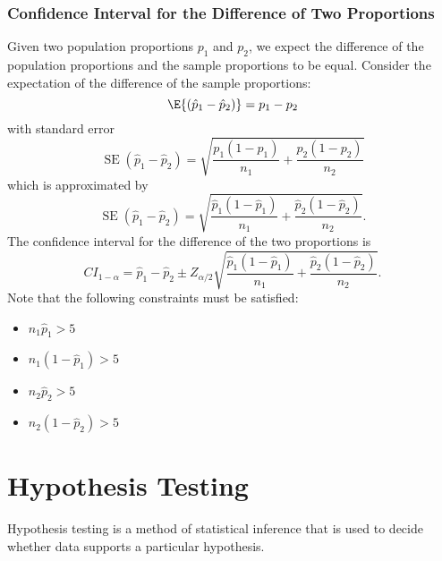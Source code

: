 \documentclass{article}
\begin{document}
\subsubsection{Confidence Interval for the Difference of Two Proportions}
Given two population proportions \(p_1\) and \(p_2\), we expect the
difference of the population proportions and the sample proportions to
be equal. Consider the expectation of the difference of the sample
proportions:
\begin{equation*}
    \E{\left( \hat{p}_1 - \hat{p}_2 \right)} = p_1 - p_2
\end{equation*}
with standard error
\begin{equation*}
    \operatorname{SE}\left( \hat{p}_1 - \hat{p}_2 \right) = \sqrt{\frac{p_1\left( 1 - p_1 \right)}{n_1} + \frac{p_2\left( 1 - p_2 \right)}{n_2}}
\end{equation*}
which is approximated by
\begin{equation*}
    \operatorname{SE}\left( \hat{p}_1 - \hat{p}_2 \right) = \sqrt{\frac{\hat{p}_1\left( 1 - \hat{p}_1 \right)}{n_1} + \frac{\hat{p}_2\left( 1 - \hat{p}_2 \right)}{n_2}}.
\end{equation*}
The confidence interval for the difference of the two proportions is
\begin{equation*}
    CI_{1-\alpha} = \hat{p}_1 - \hat{p}_2 \pm Z_{\alpha/2} \sqrt{\frac{\hat{p}_1\left( 1 - \hat{p}_1 \right)}{n_1} + \frac{\hat{p}_2\left( 1 - \hat{p}_2 \right)}{n_2}}.
\end{equation*}
Note that the following constraints must be satisfied:
\begin{itemize}
    \item \(n_1 \hat{p}_1 > 5\)
    \item \(n_1 \left( 1 - \hat{p}_1 \right) > 5\)
    \item \(n_2 \hat{p}_2 > 5\)
    \item \(n_2 \left( 1 - \hat{p}_2 \right) > 5\)
\end{itemize}
\section{Hypothesis Testing}
Hypothesis testing is a method of statistical inference that is used to
decide whether data supports a particular hypothesis.
\end{document}
